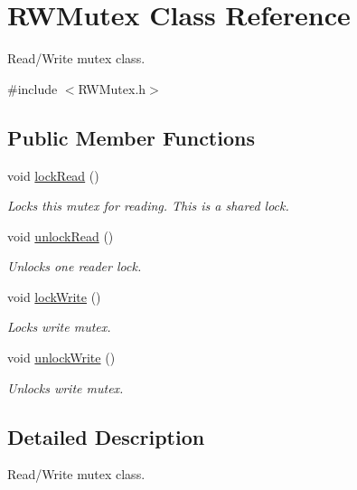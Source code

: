 \hypertarget{classRWMutex}{}\section{R\+W\+Mutex Class Reference}
\label{classRWMutex}


Read/\+Write mutex class.  




{\ttfamily \#include $<$R\+W\+Mutex.\+h$>$}

\subsection*{Public Member Functions}
\begin{DoxyCompactItemize}
\item 
void \mbox{\hyperlink{classRWMutex_ab76f003469059259e2a48e9ed6643c25}{lock\+Read}} ()
\begin{DoxyCompactList}\small\item\em Locks this mutex for reading. This is a shared lock. \end{DoxyCompactList}\item 
void \mbox{\hyperlink{classRWMutex_aa71e2ce4d243c3d4c471a7fe55381b2f}{unlock\+Read}} ()
\begin{DoxyCompactList}\small\item\em Unlocks one reader lock. \end{DoxyCompactList}\item 
void \mbox{\hyperlink{classRWMutex_ac977d0b492c040e36a77b55ee3ae9c04}{lock\+Write}} ()
\begin{DoxyCompactList}\small\item\em Locks write mutex. \end{DoxyCompactList}\item 
\mbox{\label{classRWMutex_a2f145529b60c90b3eba0ac0fd547f2b2}} 
void \mbox{\hyperlink{classRWMutex_a2f145529b60c90b3eba0ac0fd547f2b2}{unlock\+Write}} ()
\begin{DoxyCompactList}\small\item\em Unlocks write mutex. \end{DoxyCompactList}\end{DoxyCompactItemize}


\subsection{Detailed Description}
Read/\+Write mutex class. 

